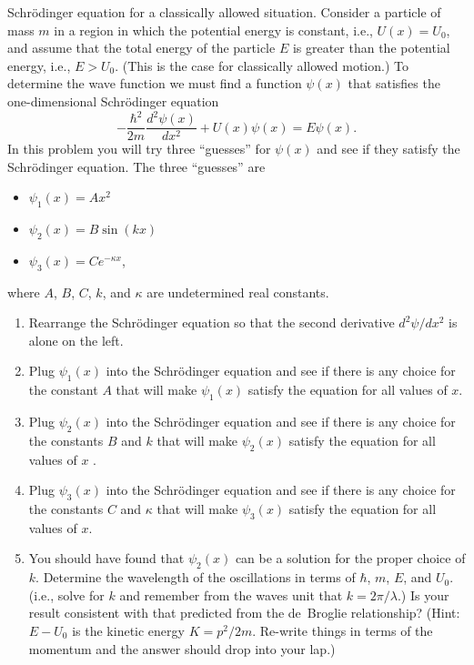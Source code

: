 \begin{aproblem}{Schr\"{o}dinger equation for a classically allowed
situation.}  
  Consider a particle of mass $m$ in a region in which the potential
  energy is constant, i.e., $U(x)=U_0$, and assume that the total
  energy of the particle $E$ is greater than the potential energy,
  i.e., $E>U_0$.  (This is the case for classically allowed motion.)
  To determine the wave function we must find a function $\psi(x)$
  that satisfies the one-dimensional Schr\"{o}dinger equation
  \[ -\frac{\hbar^2}{2m} \frac{d^2\psi(x)}{dx^2} + U(x)\psi(x) 
  = E\psi(x).  
  \]
  In this problem you will try three ``guesses'' for $\psi(x)$ and see
  if they satisfy the Schr\"{o}dinger equation. The three ``guesses''
  are
  \begin{itemize}
  \item $\psi_1(x) = Ax^2$ 
  \item $\psi_2(x) = B\sin(kx)$
  \item $\psi_3(x) = Ce^{-\kappa x}$,
  \end{itemize}
  where $A$, $B$, $C$, $k$, and $\kappa$ are undetermined real
  constants.
  \begin{enumerate}
  \item Rearrange the Schr\"{o}dinger equation so that the second
    derivative $d^2\psi/dx^2$ is alone on the left.
  \item Plug $\psi_1(x)$ into the Schr\"{o}dinger equation and see if
    there is any choice for the constant $A$ that will make
    $\psi_1(x)$ satisfy the equation for all values of $x$.
  \item Plug $\psi_2(x)$ into the Schr\"{o}dinger equation and see if
    there is any choice for the constants $B$ and $k$ that will make
    $\psi_2(x)$ satisfy the equation for all values of $x$ .
  \item Plug $\psi_3(x)$ into the Schr\"{o}dinger equation and see if
    there is any choice for the constants $C$ and $\kappa$ that will
    make $\psi_3(x)$ satisfy the equation for all values of $x$.
  \item You should have found that $\psi_2(x)$ can be a solution for
    the proper choice of $k$.  Determine the wavelength of the
    oscillations in terms of $\hbar$, $m$, $E$, and $U_0$. (i.e.,
    solve for $k$ and remember from the waves unit that
    $k=2\pi/\lambda$.)  Is your result consistent with that predicted
    from the de~Broglie relationship?  (Hint: $E-U_0$ is the kinetic
    energy $K = p^2/2m$.  Re-write things in terms of the momentum and
    the answer should drop into your lap.)
  \end{enumerate}
\end{aproblem}


